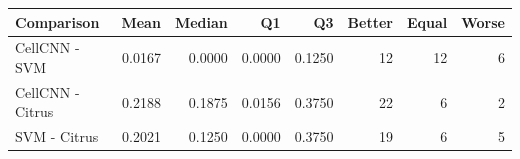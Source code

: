 \begin{tabular}{lrrrrrrr}
\toprule
Comparison & Mean & Median & Q1 & Q3 & Better & Equal & Worse \\
\midrule
CellCNN - SVM & 0.0167 & 0.0000 & 0.0000 & 0.1250 & 12 & 12 & 6 \\
CellCNN - Citrus & 0.2188 & 0.1875 & 0.0156 & 0.3750 & 22 & 6 & 2 \\
SVM - Citrus & 0.2021 & 0.1250 & 0.0000 & 0.3750 & 19 & 6 & 5 \\
\bottomrule
\end{tabular}
